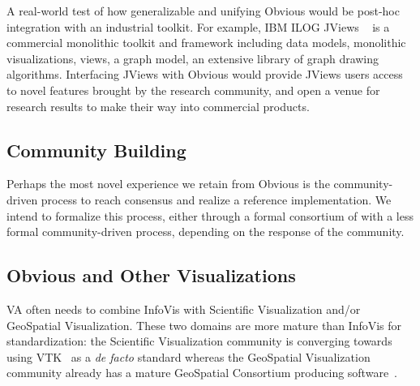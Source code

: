 A real-world test of how generalizable and unifying Obvious would be
post-hoc integration with an industrial toolkit.  For example,
IBM ILOG JViews ~\cite{JViews} is a commercial monolithic toolkit and
framework including data models, monolithic visualizations, views, a
graph model, an extensive library of graph drawing algorithms.
Interfacing JViews with Obvious would provide JViews users
access to novel features brought by the research community, and open a
venue for research results to make their way into commercial products.

\subsection{Community Building}

Perhaps the most novel experience we retain from Obvious is the
community-driven process to reach consensus and realize a reference
implementation.  We intend to formalize this process, either through a
formal consortium of with a less formal community-driven process,
depending on the response of the community.

\begin{comment}
 experiment on various means to carry this
community-driven consensus building, to see how it can help
consolidate acquired experience in the craft of toolkit design.


In many respects, this process is akin to a
standardization process, only it lacks the industry incentive and
backing. Like open source projects, we shall only count on voluntary
contributions (aside partial of funding from public research grants),
only, in the present state of toolkits, it is much more tempting to
devise and expand one's own toolkit than contribute and make
compromise to use a shared design which still lacks serious adoption.


As an afterthought, we find such consolidation effort is rarely found
in research domains, and yet should surely help make the field more
visible and readable from an outsider perspective.
\end{comment}

\subsection{Obvious and Other Visualizations}

VA often needs to combine InfoVis with Scientific
Visualization and/or GeoSpatial Visualization.  These two domains are
more mature than InfoVis for standardization: the Scientific
Visualization community is converging towards using VTK~\cite{VTK} as
a \textit{de facto} standard whereas the GeoSpatial Visualization
community already has a mature GeoSpatial Consortium producing
software~\cite{OpenGeospatial}.

